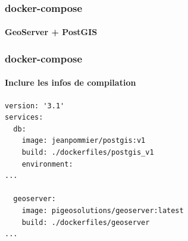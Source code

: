 \documentclass[11pt]{beamer}
\begin{document}
\begin{frame}[fragile]
\frametitle{docker-compose}
\framesubtitle{GeoServer + PostGIS}

\end{frame}

\begin{frame}[fragile]
\frametitle{docker-compose}
\framesubtitle{Inclure les infos de compilation}
\begin{lstlisting}
version: '3.1'
services:
  db:
    image: jeanpommier/postgis:v1
    build: ./dockerfiles/postgis_v1
    environment:
...

  geoserver:
    image: pigeosolutions/geoserver:latest
    build: ./dockerfiles/geoserver
...
    
\end{lstlisting}
\end{frame}
\end{document}

